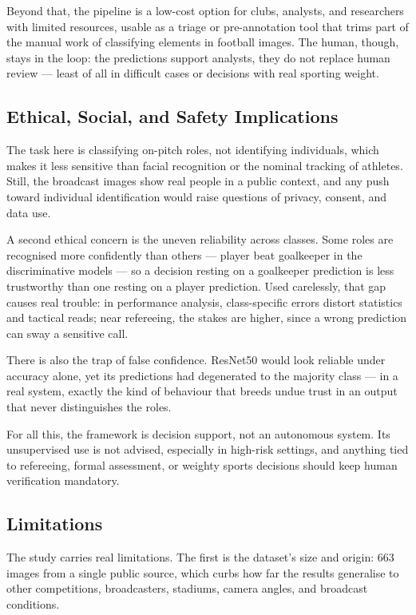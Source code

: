 \documentclass[preprint,12pt]{elsarticle}
\begin{document}
Beyond that, the pipeline is a low-cost option for clubs, analysts, and researchers with limited resources, usable as a triage or pre-annotation tool that trims part of the manual work of classifying elements in football images. The human, though, stays in the loop: the predictions support analysts, they do not replace human review --- least of all in difficult cases or decisions with real sporting weight.

\subsection{Ethical, Social, and Safety Implications}

The task here is classifying on-pitch roles, not identifying individuals, which makes it less sensitive than facial recognition or the nominal tracking of athletes. Still, the broadcast images show real people in a public context, and any push toward individual identification would raise questions of privacy, consent, and data use.

A second ethical concern is the uneven reliability across classes. Some roles are recognised more confidently than others --- player beat goalkeeper in the discriminative models --- so a decision resting on a goalkeeper prediction is less trustworthy than one resting on a player prediction. Used carelessly, that gap causes real trouble: in performance analysis, class-specific errors distort statistics and tactical reads; near refereeing, the stakes are higher, since a wrong prediction can sway a sensitive call.

There is also the trap of false confidence. ResNet50 would look reliable under accuracy alone, yet its predictions had degenerated to the majority class --- in a real system, exactly the kind of behaviour that breeds undue trust in an output that never distinguishes the roles.

For all this, the framework is decision support, not an autonomous system. Its unsupervised use is not advised, especially in high-risk settings, and anything tied to refereeing, formal assessment, or weighty sports decisions should keep human verification mandatory.

\subsection{Limitations}

The study carries real limitations. The first is the dataset's size and origin: 663 images from a single public source, which curbs how far the results generalise to other competitions, broadcasters, stadiums, camera angles, and broadcast conditions.
\end{document}
